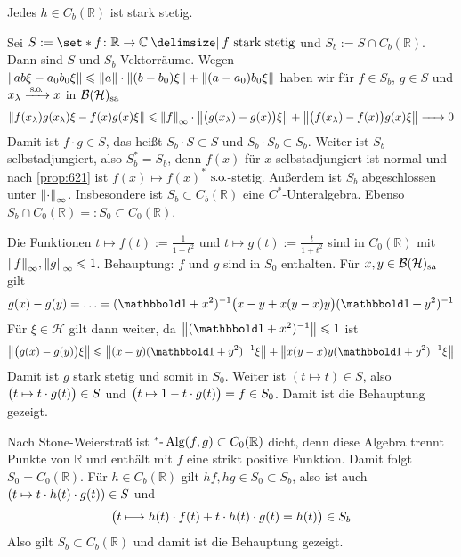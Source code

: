 \begin{proposition}[label=prop:623,{name=[jede beschränkte stetige Funktion ist stark stetig]}]
	Jedes $h \in C_b(\mathbb{R})$ ist stark stetig.
\end{proposition}
\begin{beweis}
	Sei $S := \set*{f \colon \mathbb{R}\to \mathbb{C} \given f \text{ stark stetig}}$ und $S_b := S \cap C_b(\mathbb{R})$.
	Dann sind $S$ und $S_b$ Vektorräume. 
	Wegen $\norm*{ab \xi - a_0 b_0 \xi} \le \norm*{a} \cdot \norm*{(b-b_0)\xi} + \norm*{(a-a_0)b_0\xi}$ haben wir für $f \in S_b$, $g \in S$ und $x_\lambda \grenzw{\so}x$ in $\mathcal{B}(\mathcal{H})_\sa$
	\[
		\norm*{f(x_\lambda) g(x_\lambda) \xi - f(x) g(x)\xi} \le \norm*{f}_\infty \cdot \norm*{\enbrace[\big]{g(x_\lambda)- g(x)}\xi} + \norm*{ \enbrace[\big]{f(x_\lambda)- f(x)} g(x) \xi}
		\grenzw{} 0
	\]
	Damit ist $f \cdot g \in S$, das heißt $S_b \cdot S \subset S$ und $S_b \cdot S_b \subset S_b$.
	Weiter ist $S_b$ selbstadjungiert, also $S_b^*=S_b$, denn  $f(x)$ für $x$ selbstadjungiert  ist normal und nach \autoref{prop:621} ist $f(x) \mapsto f(x)^*$ $\so$-stetig. 
	Außerdem ist $S_b$ abgeschlossen unter $\norm*{\cdot}_\infty$.
	Insbesondere ist $S_b \subset C_b(\mathbb{R})$ eine $C^*$-Unteralgebra.
	Ebenso $S_b \cap C_0(\mathbb{R}) =: S_0 \subset C_0(\mathbb{R})$.
	
	Die Funktionen $t \mapsto f(t):= \frac{1}{1+t^2}$ und $t \mapsto g(t) := \frac{t}{1+t^2}$ sind in $C_0(\mathbb{R})$ mit $\norm*{f}_\infty, \norm*{g}_\infty\le 1$.
	Behauptung: $f$ und $g$ sind in $S_0$ enthalten.
	Für $x,y \in \mathcal{B}(\mathcal{H})_\sa$ gilt 
	\[
		g(x)-g(y)= \ldots = (\ind+x^2)^{-1} \enbrace[\big]{x-y+x(y-x)y} (\ind+y^2)^{-1} 
	\]
	Für $\xi \in \mathcal{H}$ gilt dann weiter, da $\norm*{(\ind+x^2)^{-1}} \le 1$ ist
	\[
		\norm*{\enbrace[\big]{g(x)-g(y)}\xi} \le \norm*{(x-y)(\ind+y^2)^{-1} \xi} + \norm*{x(y-x) y(\ind+y^2)^{-1} \xi}
	\]
	Damit ist $g$ stark stetig und somit in $S_0$.
	Weiter ist $(t \mapsto t) \in S$, also $\enbrace[\big]{t \mapsto t \cdot g(t)} \in S$ und $\enbrace[\big]{t \mapsto 1-t \cdot g(t)}=f \in S_0$. 
	Damit ist die Behauptung gezeigt.
	
	Nach Stone-Weierstraß ist $^*\text{-}\Alg(f,g) \subset C_0(\mathbb{R})$ dicht, denn diese Algebra trennt Punkte von $\mathbb{R}$ und enthält mit $f$ eine strikt positive Funktion.
	Damit folgt $S_0=C_0(\mathbb{R})$.
	Für $h \in C_b(\mathbb{R})$ gilt $hf, hg \in S_0 \subset S_b$, also ist auch $\enbrace*{t \mapsto t \cdot h(t) \cdot g(t)} \in S$ und
	\[
		\enbrace[\big]{t \longmapsto h(t) \cdot f(t) + t \cdot h(t) \cdot g(t)=h(t)} \in S_b
	\]
	Also gilt $S_b \subset C_b(\mathbb{R})$ und damit ist die Behauptung gezeigt.
\end{beweis}

